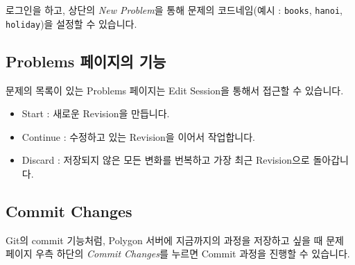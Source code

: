 \documentclass{article}
\begin{document}
    로그인을 하고, 상단의 \textit{New Problem}을 통해 문제의 코드네임(예시 : \verb|books|, \verb|hanoi|, \verb|holiday|)을 설정할 수 있습니다.
    \subsection{Problems 페이지의 기능}
    문제의 목록이 있는 Problems 페이지는 Edit Session을 통해서 접근할 수 있습니다.
    \begin{itemize}
        \item Start : 새로운 Revision을 만듭니다.
        \item Continue : 수정하고 있는 Revision을 이어서 작업합니다.
        \item Discard : 저장되지 않은 모든 변화를 번복하고 가장 최근 Revision으로 돌아갑니다.
    \end{itemize}
    \subsection{Commit Changes}
    Git의 commit 기능처럼, Polygon 서버에 지금까지의 과정을 저장하고 싶을 때 문제 페이지 우측 하단의 \textit{Commit Changes}를 누르면 Commit 과정을 진행할 수 있습니다.
\end{document}
